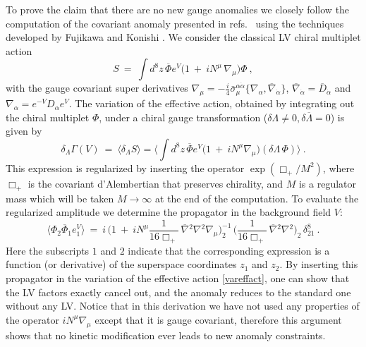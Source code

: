\documentclass[12pt]{revtex4}
\begin{document}
To prove the claim that there are no new gauge anomalies we 
closely follow the computation of the covariant anomaly presented in 
refs.\ \cite{Hayashi:1998ca,Gates:2000gu} using the techniques
developed by Fujikawa and Konishi
\cite{Fujikawa:1983bg,Konishi:1985tu}. We consider the classical LV
chiral multiplet action  
%
\begin{equation}
S ~=~ \int d^8z\, \overline{\Phi} 
e^V \Big(1 ~+~ i N^\mu\, \nabla_\mu  \Big) \Phi~, 
\end{equation}
%
with the gauge covariant super derivatives 
$\nabla_\mu = - \frac i4 \bar\sigma^{\alpha\dot\alpha}_\mu 
\{ \nabla_\alpha, \overline{\nabla}_{\dot\alpha} \}$, 
$\overline{\nabla}_{\dot\alpha} = \overline{D}_{\dot\alpha}$ and 
$ \nabla_\alpha = e^{-V}D_\alpha e^V$. The variation of the effective
action, obtained by integrating out the chiral multiplet $\Phi$, under a
chiral gauge transformation 
($\delta \Lambda \neq 0, \delta \overline{\Lambda} = 0$)
is given by 
%
\begin{equation}
\delta_\Lambda\Gamma(V) ~=~ 
\langle \delta_\Lambda S \rangle = 
\Big\langle \int d^8z\,  \overline{\Phi} 
e^V \Big(1 ~+~ i N^\mu \nabla_\mu  \Big) (\delta \Lambda\, \Phi)
\Big\rangle~.
\label{vareffact}
\end{equation} 
%
This expression is regularized by inserting the operator 
$\exp (\Box_+/M^2)$, where $\Box_+$ is the covariant d'Alembertian that
preserves chirality, and $M$ is a regulator mass which will be taken
$M \rightarrow \infty$ at the end of the computation. To
evaluate the regularized amplitude we determine the propagator in the
background field $V$: 
%
\begin{equation}
\langle \Phi_2 \overline{\Phi}_1 e^V_1 \rangle ~=~ 
i\,  \Big(   
1 ~+~ i N^\mu \frac 1{16 \Box_+}\,  \overline{\nabla}{}^2 \nabla{}^2
\nabla_\mu
\Big)^{-1}_2 \, 
\Big( 
\frac 1{16 \Box_+} \, \overline{\nabla}{}^2 \nabla{}^2
\Big)_2 \, \delta^8_{21}~.
\end{equation}
%
Here the subscripts $1$ and $2$ indicate that the corresponding
expression is a function (or derivative) of the superspace coordinates
$z_1$ and $z_2$. By inserting this propagator in the variation of the
effective action \eqref{vareffact}, one can show that the LV
factors exactly cancel out, and the anomaly reduces to the standard
one without any LV. Notice that in this derivation we
have not used any properties of the operator $i N^\mu \nabla_\mu$
except that it is gauge covariant, therefore this argument 
shows that no kinetic modification ever leads to new anomaly
constraints. 
\end{document}
